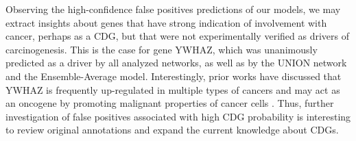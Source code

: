 \begin{table}[!ht]
\centering
\caption{Top ten false positives driver genes with the highest predicted probabilities according to some selected approaches.\label{tab:top_falsos_positivos}}
\end{table}


Observing the high-confidence false positives predictions of our models, we may extract insights about genes that have strong indication of involvement with cancer, perhaps as a CDG, but that were not experimentally verified as drivers of carcinogenesis. This is the case for gene YWHAZ, which was unanimously predicted as a driver by all analyzed networks, as well as by the UNION network and the Ensemble-Average model. Interestingly, prior works have discussed that YWHAZ is frequently up-regulated in multiple types of cancers and may act as an oncogene by promoting malignant properties of cancer cells \cite{gan2020role}. Thus, further investigation of false positives associated with high CDG probability is interesting to review original annotations and expand the current knowledge about CDGs.











